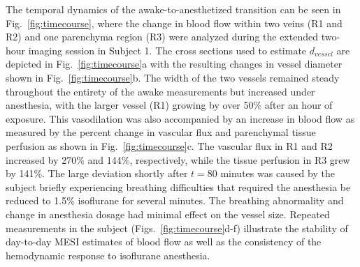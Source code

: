 \documentclass[review]{elsarticle}
\begin{document}
The temporal dynamics of the awake-to-anesthetized transition can be seen in Fig.~\ref{fig:timecourse}, where the change in blood flow within two veins (R1 and R2) and one parenchyma region (R3) were analyzed during the extended two-hour imaging session in Subject 1. The cross sections used to estimate $d_{vessel}$ are depicted in Fig.~\ref{fig:timecourse}a with the resulting changes in vessel diameter shown in Fig.~\ref{fig:timecourse}b. The width of the two vessels remained steady throughout the entirety of the awake measurements but increased under anesthesia, with the larger vessel (R1) growing by over 50\% after an hour of exposure. This vasodilation was also accompanied by an increase in blood flow as measured by the percent change in vascular flux and parenchymal tissue perfusion as shown in Fig.~\ref{fig:timecourse}c. The vascular flux in R1 and R2 increased by 270\% and 144\%, respectively, while the tissue perfusion in R3 grew by 141\%. The large deviation shortly after $t = 80$ minutes was caused by the subject briefly experiencing breathing difficulties that required the anesthesia be reduced to 1.5\% isoflurane for several minutes. The breathing abnormality and change in anesthesia dosage had minimal effect on the vessel size. Repeated measurements in the subject (Figs.~\ref{fig:timecourse}d-f) illustrate the stability of day-to-day MESI estimates of blood flow as well as the consistency of the hemodynamic response to isoflurane anesthesia.
\end{document}

